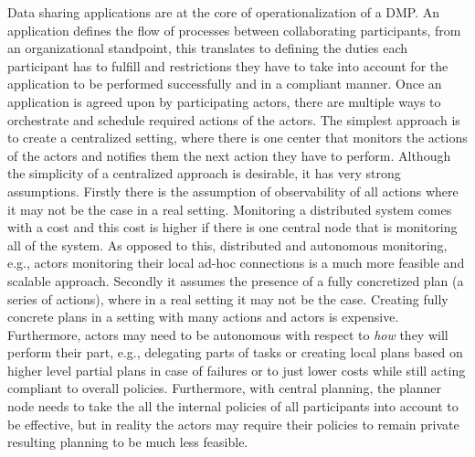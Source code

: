 Data sharing applications are at the core of operationalization of a DMP. An application defines the flow of processes between collaborating participants, from an organizational standpoint, this translates to defining the duties each participant has to fulfill and restrictions they have to take into account for the application to be performed successfully and in a compliant manner. Once an application is agreed upon by participating actors, there are multiple ways to orchestrate and schedule required actions of the actors. The simplest approach is to create a centralized setting, where there is one center that monitors the actions of the actors and notifies them the next action they have to perform. Although the simplicity of a centralized approach is desirable, it has very strong assumptions. Firstly there is the assumption of observability of all actions where it may not be the case in a real setting. Monitoring a distributed system comes with a cost and this cost is higher if there is one central node that is monitoring all of the system. As opposed to this, distributed and autonomous monitoring, e.g., actors monitoring their local ad-hoc connections is a much more feasible and scalable approach. Secondly it assumes the presence of a fully concretized plan (a series of actions), where in a real setting it may not be the case. Creating fully concrete plans in a setting with many actions and actors is expensive. Furthermore, actors may need to be autonomous with respect to \textit{how} they will perform their part, e.g., delegating parts of tasks or creating local plans based on higher level partial plans in case of failures or to just lower costs while still acting compliant to overall policies. Furthermore, with central planning, the planner node needs to take the all the internal policies of all participants into account to be effective, but in reality the actors may require their policies to remain private resulting planning to be much less feasible.


